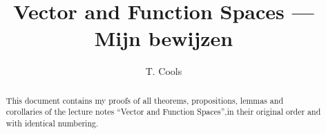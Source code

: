 \documentclass[10pt,a4paper]{article}
\title{Vector and Function Spaces --- Mijn bewijzen}
\author{T. Cools}
\date{}
\begin{document}
\maketitle
\vspace{-2em}
\begin{abstract}
This document contains my proofs of all theorems, propositions,
lemmas and corollaries of the lecture notes
``Vector and Function Spaces'',in their original order and with identical numbering.
\end{abstract}
\vspace{1em}




















\end{document}
